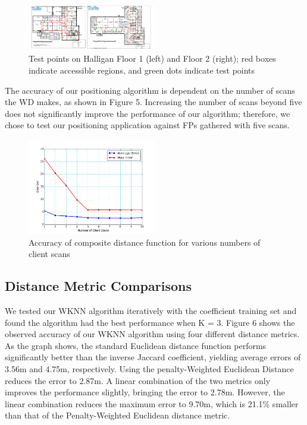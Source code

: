 \documentclass[conference]{IEEEtran}
\begin{document}
\begin{figure}[h!]
  \centering
    \includegraphics[width=0.5\textwidth]{testpoints}
   \caption{Test points on Halligan Floor 1 (left) and Floor 2 (right); red boxes indicate accessible regions, and green dots indicate test points}
\end{figure}

The accuracy of our positioning algorithm is dependent on the number of scans the WD makes, as shown in Figure 5. Increasing the number of scans beyond five does not significantly improve the performance of our algorithm; therefore, we chose to test our positioning application against FPs gathered with five scans.

\begin{figure}[h!]
  \centering
    \includegraphics[width=0.5\textwidth]{pull_errors.png}
   \caption{Accuracy of composite distance function for various numbers of client scans}
\end{figure}

\subsection{Distance Metric Comparisons}
We tested our WKNN algorithm iteratively with the coefficient training set and found the algorithm had the best performance when K = 3. Figure 6 shows the observed accuracy of our WKNN algorithm using four different distance metrics. As the graph shows, the standard Euclidean distance function performs significantly better than the inverse Jaccard coefficient, yielding average errors of 3.56m and 4.75m, respectively. Using the penalty-Weighted Euclidean Distance reduces the error to 2.87m. A linear combination of the two metrics only improves the performance slightly, bringing the error to 2.78m. However, the linear combination reduces the maximum error to 9.70m, which is 21.1\% smaller than that of the Penalty-Weighted Euclidean distance metric.
\end{document}
